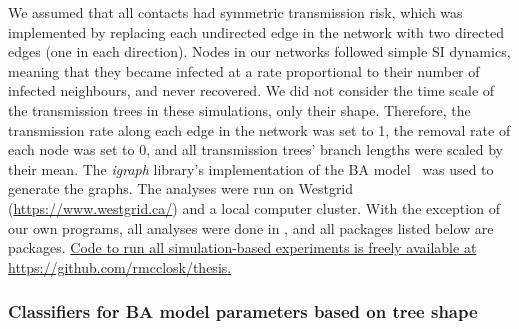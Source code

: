 We assumed that all contacts had symmetric transmission risk, which was
implemented by replacing each undirected edge in the network with two directed
edges (one in each direction). Nodes in our networks followed simple \gls{SI}
dynamics, meaning that they became infected at a rate proportional to their
number of infected neighbours, and never recovered. We did not consider the
time scale of the transmission trees in these simulations, only their shape.
Therefore, the transmission rate along each edge in the network was set to 1,
the removal rate of each node was set to 0, and all transmission trees' branch
lengths were scaled by their mean. The \textit{igraph} library's implementation
of the BA model~\autocite{csardi2006igraph} was used to generate the graphs.
The analyses were run on Westgrid (\url{https://www.westgrid.ca/}) and a local
computer cluster. With the exception of our own programs, all analyses were
done in , and all packages listed below are  packages.
{\color{blue}\uline{Code to run all simulation-based experiments is freely
available at \url{https://github.com/rmcclosk/thesis}.}}

\subsubsection*{Classifiers for BA model parameters based on tree shape}
\label{subsec:kernel}


